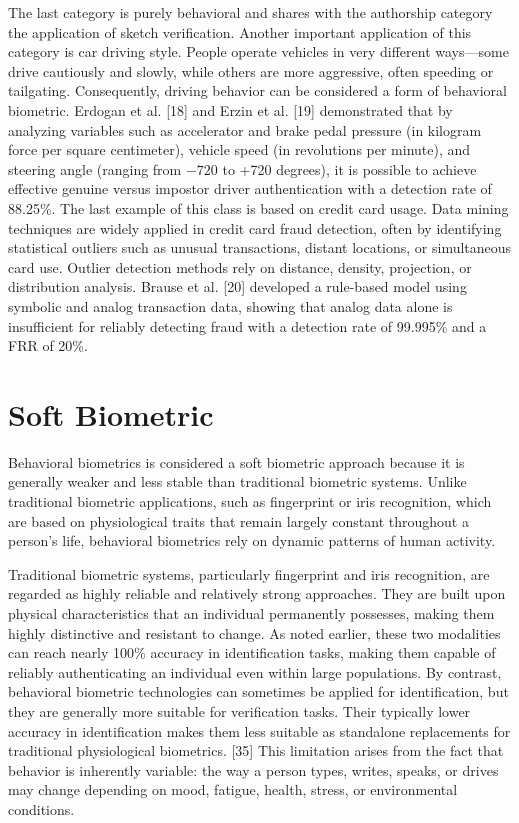 \documentclass[12pt]{report}
\begin{document}
The last category is purely behavioral and shares with the authorship category the application of sketch verification.
Another important application of this category is car driving style.
People operate vehicles in very different ways—some drive cautiously and slowly, while others are more aggressive, often speeding or tailgating. 
Consequently, driving behavior can be considered a form of behavioral biometric. 
Erdogan et al. [18] and Erzin et al. [19] demonstrated that by analyzing variables such as accelerator and brake pedal pressure (in kilogram force per square centimeter), vehicle speed (in revolutions per minute), and steering angle (ranging from \(-720\) to +720 degrees), it is possible to achieve effective genuine versus impostor driver authentication with a detection rate of 88.25\%.
The last example of this class is based on credit card usage.
Data mining techniques are widely applied in credit card fraud detection, often by identifying statistical outliers such as unusual transactions, distant locations, or simultaneous card use. 
Outlier detection methods rely on distance, density, projection, or distribution analysis. 
Brause et al. [20] developed a rule-based model using symbolic and analog transaction data, showing that analog data alone is insufficient for reliably detecting fraud with a detection rate of 99.995\% and a FRR of 20\%.

\section{Soft Biometric}

Behavioral biometrics is considered a soft biometric approach because it is generally weaker and less stable than traditional biometric systems. 
Unlike traditional biometric applications, such as fingerprint or iris recognition, which are based on physiological traits that remain largely constant throughout a person's life, behavioral biometrics rely on dynamic patterns of human activity.

Traditional biometric systems, particularly fingerprint and iris recognition, are regarded as highly reliable and relatively strong approaches. 
They are built upon physical characteristics that an individual permanently possesses, making them highly distinctive and resistant to change. 
As noted earlier, these two modalities can reach nearly 100\% accuracy in identification tasks, making them capable of reliably authenticating an individual even within large populations.
\sloppy
By contrast, behavioral biometric technologies can sometimes be applied for identification, but they are generally more suitable for verification tasks. 
\fussy
Their typically lower accuracy in identification makes them less suitable as standalone replacements for traditional physiological biometrics. [35]
This limitation arises from the fact that behavior is inherently variable: the way a person types, writes, speaks, or drives may change depending on mood, fatigue, health, stress, or environmental conditions.
\end{document}
